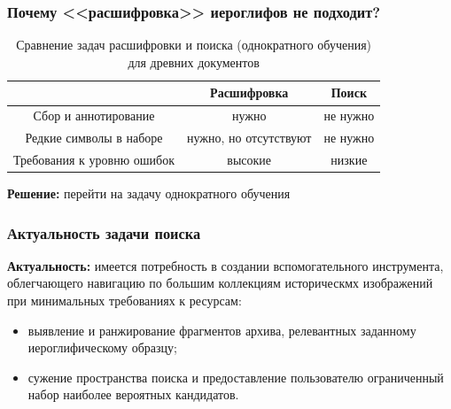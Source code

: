 \begin{frame}
    \frametitle{Почему <<расшифровка>> иероглифов не подходит?}

    \begin{table}
        \centering
        \captionsetup{justification=centering} %
        \caption{Сравнение задач расшифровки и поиска (однократного обучения) для древних документов}
        \begin{tabular}{ccc}
            \toprule
                                       & \textbf{Расшифровка}  & \textbf{Поиск} \\
            \midrule
            Сбор и аннотирование       & нужно                 & не нужно       \\
            Редкие символы в наборе    & нужно, но отсутствуют & не нужно       \\
            Требования к уровню ошибок & высокие               & низкие         \\

            \bottomrule
        \end{tabular}
    \end{table}



    \textbf{Решение:} перейти на задачу однократного обучения

\end{frame}



\begin{frame}
    \frametitle{Актуальность задачи поиска}

    \textbf{Актуальность:} имеется потребность в создании вспомогательного инструмента, облегчающего навигацию по большим коллекциям историческмх изображений при минимальных требованиях к ресурсам:
    \begin{itemize}
        \item выявление и ранжирование фрагментов архива, релевантных заданному иероглифическому образцу;
        \item сужение пространства поиска и предоставление пользователю ограниченный набор наиболее вероятных кандидатов.
    \end{itemize}
\end{frame}

